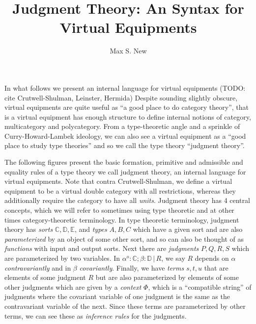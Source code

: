 \documentclass{article}
\begin{document}
\newtheorem{theorem}{Theorem}
\newtheorem{definition}{Definition}
\newcommand{\pto}{\nrightarrow}
\newcommand{\pfrom}{\nleftarrow}
\newcommand{\vcat}{\mathcal}
\newcommand{\cat}{\mathbb}
\newcommand{\vtkmnd}{\mathbb{K}\text{Mod} (\vcat{V},T)}
\newcommand{\rmod}{\text{RMod}}
\newcommand{\lmod}{\text{LMod}}

\newcommand{\id}{\text{id}}
\newcommand{\when}{\text{when}\,}
\newcommand{\sort}{\,\text{sort}}
\newcommand{\ctx}{\,\text{context}}
\newcommand{\pipe}{\,|\,}

\title{Judgment Theory: An Syntax for Virtual Equipments}
\author{Max S. New}

\maketitle

In what follows we present an internal language for virtual equipments
(TODO: cite Crutwell-Shulman, Leinster, Hermida)
%
Despite sounding slightly obscure, virtual equipments are quite useful
as ``a good place to do category theory'', that is a virtual equipment
has enough structure to define internal notions of category,
multicategory and polycategory.
%
From a type-theoretic angle and a sprinkle of Curry-Howard-Lambek
ideology, we can also see a virtual equipment as a ``good place to
study type theories'' and so we call the type theory ``judgment
theory''.

The following figures present the basic formation, primitive and
admissible and equality rules of a type theory we call judgment
theory, an internal language for virtual equipments.
%
Note that contra Crutwell-Shulman, we define a virtual equipment to be
a virtual double category with all restrictions, whereas they
additionally require the category to have all \emph{units}.
%
Judgment theory has 4 central concepts, which we will refer to
sometimes using type theoretic and at other times category-theoretic
terminology.
%
In type theoretic terminology, judgment theory has \emph{sorts} $\cat
C, \cat D, \cat E$, and \emph{types} $A,B,C$ which have a given sort
and are also \emph{parameterized} by an object of some other sort, and
so can also be thought of as \emph{functions} with input and output
sorts.
%
Next there are \emph{judgments} $P,Q,R,S$ which are parameterized by
two variables.
%
In $\alpha^o:\cat C;\beta : \cat D \pipe R$, we say $R$ depends on
$\alpha$ \emph{contravariantly} and in $\beta$ \emph{covariantly}.
%
Finally, we have \emph{terms} $s,t,u$ that are elements of some
judgment $R$ but are also parameterized by elements of some other
judgments which are given by a \emph{context} $\Phi$, which is a
``compatible string'' of judgments where the covariant variable of one
judgment is the same as the contravariant variable of the next.
%
Since these terms are parameterized by other terms, we can see these
as \emph{inference rules} for the judgments.
\end{document}
